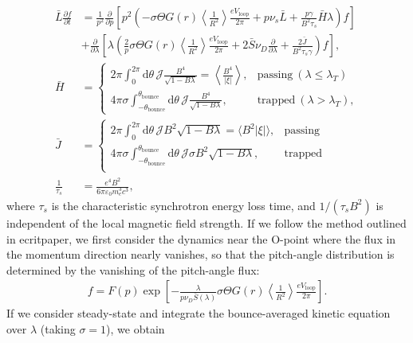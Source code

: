 \documentclass[11pt,a4paper]{article}
\newcommand{\rd}{\ensuremath{\mathrm{d}}}
\newcommand{\sub}[1]{\ensuremath{_{\text{#1}}}}
\begin{document}
\begin{align}
\bar{L}\frac{\partial f}{\partial t} &= \frac{1}{p^2}\frac{\partial}{\partial p}\left[ p^2\left( -\sigma\Theta G(r) \left\langle\frac{1}{R^2}\right\rangle\frac{e V\sub{loop}}{2\pi} + p\nu_s \bar{L} + \frac{p\gamma}{B^2\tau_s}\bar{H}\lambda \right)f\right] \nonumber \\
&+ \frac{\partial}{\partial \lambda}\left[ \lambda\left(\frac{2}{p}\sigma\Theta G(r) \left\langle\frac{1}{R^2}\right\rangle\frac{e V\sub{loop}}{2\pi} + 2 \bar{S}\nu_D\frac{\partial}{\partial \lambda} + \frac{2\bar{J}}{B^2\tau_s \gamma}  \right)f\right], \\ 
\bar{H} &= \begin{cases}
2\pi \int_0^{2\pi}\rd \theta \, \mathcal{J} \frac{B^4}{\sqrt{1-B\lambda}} = \left\langle\frac{B^4}{|\xi|}\right\rangle , & \text{passing}~(\lambda \leq \lambda_T) \\
4\pi \sigma \int_{-\theta\sub{bounce}}^{\theta\sub{bounce}} \rd \theta \, \mathcal{J} \frac{B^4}{\sqrt{1-B\lambda}}, & \text{trapped}~(\lambda > \lambda_T),
\end{cases} \nonumber \\
\bar{J} &= \begin{cases}
2\pi \int_0^{2\pi} \rd \theta \,\mathcal{J} B^2\sqrt{1-B\lambda}  = \langle B^2|\xi| \rangle, & \text{passing} \\
4\pi\sigma \int_{-\theta\sub{bounce}}^{\theta\sub{bounce}} \rd \theta \,\mathcal{J}\sigma B^2\sqrt{1-B\lambda}, & \text{trapped} \\
\end{cases}\nonumber \\
\frac{1}{\tau_s} &= \frac{e^4 B^2}{6\pi \varepsilon_0 m_e^3 c^3},
\end{align}
where $\tau_s$ is the characteristic synchrotron energy loss time, and $1/(\tau_s B^2)$ is independent of the local magnetic field strength. If we follow the method outlined in ecritpaper, we first consider the dynamics near the O-point where the flux in the momentum direction nearly vanishes, so that the pitch-angle distribution is determined by the vanishing of the pitch-angle flux:
\begin{align}
f = F(p) \exp\left[ - \frac{\lambda}{p\nu_D \bar{S}(\lambda)}\sigma\Theta G(r) \left\langle\frac{1}{R^2}\right\rangle\frac{e V\sub{loop}}{2\pi} \right].
\end{align}
If we consider steady-state and integrate the bounce-averaged kinetic equation over $\lambda$ (taking $\sigma=1$), we obtain 
\end{document}
